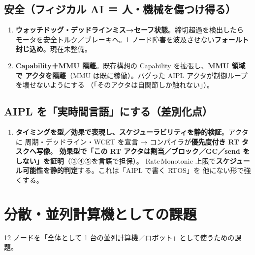 \documentclass[11pt,a4paper]{article}
\begin{document}
\subsection{安全（フィジカル AI ＝ 人・機械を傷つけ得る）}

\begin{enumerate}[leftmargin=1.7em]
  \item[\textbf{⑧}] \textbf{ウォッチドッグ・デッドラインミス→セーフ状態}。締切超過を検出したら
    モータを安全トルク／ブレーキへ。1 ノード障害を波及させない\textbf{フォールト封じ込め}。現在未整備。
  \item[\textbf{⑨}] \textbf{Capability＋MMU 隔離}。既存構想の Capability を拡張し、\textbf{MMU 領域で
    アクタを隔離}（MMU は既に稼働）。バグった AIPL アクタが制御ループを壊せないようにする
    （「そのアクタは自関節しか触れない」）。
\end{enumerate}

\subsection{AIPL を「実時間言語」にする（差別化点）}

\begin{enumerate}[leftmargin=1.7em]
  \item[\textbf{⑩}] \textbf{タイミングを型／効果で表現し、スケジューラビリティを静的検証}。アクタに
    周期・デッドライン・WCET を宣言 → コンパイラが\textbf{優先度付き RT タスクへ写像}。
    \textbf{効果型で「この RT アクタは割当／ブロック／GC／send をしない」を証明}（③④⑤を言語で担保）。
    Rate\,Monotonic 上限で\textbf{スケジュール可能性を静的判定}する。これは「AIPL で書く RTOS」を
    他にない形で強くする。
\end{enumerate}

\section{分散・並列計算機としての課題}
\label{sec:dist}

12 ノードを「全体として 1 台の並列計算機／ロボット」として使うための課題。
\end{document}
